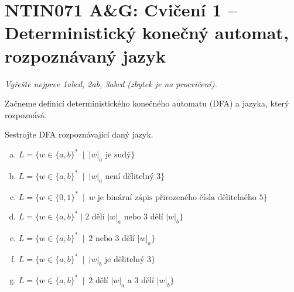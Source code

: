 \documentclass[a4paper,12pt]{amsart}
\begin{document}
\thispagestyle{empty}

\section*{NTIN071 A\&G: Cvičení 1 -- Deterministický konečný automat, rozpoznávaný jazyk}


\medskip

\noindent\emph{Vyřešte nejprve 1abcd, 2ab, 3abcd (zbytek je na procvičení).}

\medskip

\medskip\noindent Začneme definicí deterministického konečného automatu (DFA) a jazyka, který rozpoznává.

\medskip\begin{problem}
    
    Sestrojte DFA rozpoznávající daný jazyk.

    \medskip
    
    \begin{enumerate}[(a)]\setlength\itemsep{12pt}
        \item $L=\{w\in\{a,b\}^* \ \mid \  |w|_a \text{ je sudý}\}$
        \item $L=\{w\in\{a,b\}^* \ \mid \  |w|_a \text{ není dělitelný 3}\}$
        \item $L=\{w\in\{0,1\}^* \ \mid \  w\text{ je binární zápis přirozeného čísla dělitelného 5}\}$
        \item $L=\{w\in\{a,b\}^* \mid \text{2 dělí $|w|_a$ nebo 3 dělí $|w|_b$}\}$ 
        \item $L=\{w\in\{a,b\}^* \ \mid \  \text{2 nebo 3 dělí }|w|_a\}$
        \item $L=\{w\in\{a,b\}^* \ \mid \  |w|_b \text{ je dělitelný 3}\}$
        \item $L=\{w\in\{a,b\}^* \ \mid \  \text{2 dělí $|w|_a$ a 3 dělí $|w|_b$}\}$        
        
    \end{enumerate}

\end{problem}
\end{document}
